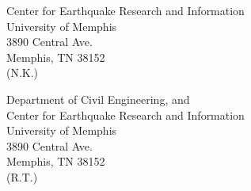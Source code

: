 
\vspace{4ex}

\noindent
Center for Earthquake Research and Information\\
University of Memphis\\
3890 Central Ave.\\
Memphis, TN 38152\\
\indent(N.K.)

\vspace{2ex}

\noindent
Department of Civil Engineering, and\\
Center for Earthquake Research and Information\\
University of Memphis\\
3890 Central Ave.\\
Memphis, TN 38152\\
\indent(R.T.)
